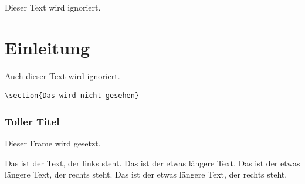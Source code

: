 \documentclass{ltx-talk}
\begin{document}
Dieser Text wird ignoriert.

\section{Einleitung}
\label{sec:intro}

Auch dieser Text wird ignoriert.

\begin{verbatim}
\section{Das wird nicht gesehen}
\end{verbatim}

\begin{frame}
  \frametitle{Toller Titel}
  Dieser Frame wird gesetzt.
  \begin{twocolumns}[t,c]
    Das ist der Text, der links steht.
    \nextcolumn
    Das ist der etwas längere Text.
    Das ist der etwas längere Text, der rechts steht.
    Das ist der etwas längere Text, der rechts steht.
  \end{twocolumns}
\end{frame}


\end{document}
